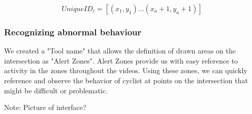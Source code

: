 \begin{equation}
  UniqueID_i = [(x_1, y_1)...(x_a+1, y_a+1)]\label{eq:3}
\end{equation}

\subsubsection{Recognizing abnormal behaviour}

We created a "Tool name" that allows the definition of drawn areas on the intersection as "Alert Zones". 
Alert Zones provide us with easy reference to activity in the zones throughout the videos. 
Using these zones, we can quickly reference and observe the behavior of cyclist at points on the 
intersection that might be difficult or problematic.

Note: Picture of interface?
